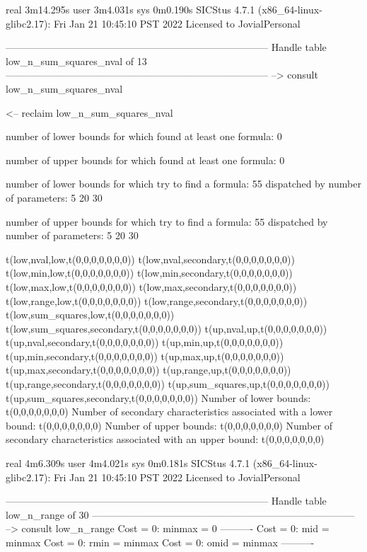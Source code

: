 real	3m14.295s
user	3m4.031s
sys	0m0.190s
SICStus 4.7.1 (x86_64-linux-glibc2.17): Fri Jan 21 10:45:10 PST 2022
Licensed to JovialPersonal


--------------------------------------------------------------------------------
Handle table low_n_sum_squares_nval of 13
--------------------------------------------------------------------------------
--> consult low_n_sum_squares_nval

<-- reclaim low_n_sum_squares_nval

number of lower bounds for which found at least one formula: 0

number of upper bounds for which found at least one formula: 0

number of lower bounds for which try to find a formula: 55
dispatched by number of parameters: 5  20  30

number of upper bounds for which try to find a formula: 55
dispatched by number of parameters: 5  20  30

t(low,nval,low,t(0,0,0,0,0,0,0))
t(low,nval,secondary,t(0,0,0,0,0,0,0))
t(low,min,low,t(0,0,0,0,0,0,0))
t(low,min,secondary,t(0,0,0,0,0,0,0))
t(low,max,low,t(0,0,0,0,0,0,0))
t(low,max,secondary,t(0,0,0,0,0,0,0))
t(low,range,low,t(0,0,0,0,0,0,0))
t(low,range,secondary,t(0,0,0,0,0,0,0))
t(low,sum_squares,low,t(0,0,0,0,0,0,0))
t(low,sum_squares,secondary,t(0,0,0,0,0,0,0))
t(up,nval,up,t(0,0,0,0,0,0,0))
t(up,nval,secondary,t(0,0,0,0,0,0,0))
t(up,min,up,t(0,0,0,0,0,0,0))
t(up,min,secondary,t(0,0,0,0,0,0,0))
t(up,max,up,t(0,0,0,0,0,0,0))
t(up,max,secondary,t(0,0,0,0,0,0,0))
t(up,range,up,t(0,0,0,0,0,0,0))
t(up,range,secondary,t(0,0,0,0,0,0,0))
t(up,sum_squares,up,t(0,0,0,0,0,0,0))
t(up,sum_squares,secondary,t(0,0,0,0,0,0,0))
Number of lower bounds:                                             t(0,0,0,0,0,0,0)
Number of secondary characteristics associated with a lower bound:  t(0,0,0,0,0,0,0)
Number of upper bounds:                                             t(0,0,0,0,0,0,0)
Number of secondary characteristics associated with an upper bound: t(0,0,0,0,0,0,0)

real	4m6.309s
user	4m4.021s
sys	0m0.181s
SICStus 4.7.1 (x86_64-linux-glibc2.17): Fri Jan 21 10:45:10 PST 2022
Licensed to JovialPersonal


--------------------------------------------------------------------------------
Handle table low_n_range of 30
--------------------------------------------------------------------------------
--> consult low_n_range
Cost =  0:  minmax = 0
----------
Cost =  0:  mid    = minmax
Cost =  0:  rmin   = minmax
Cost =  0:  omid   = minmax
----------

